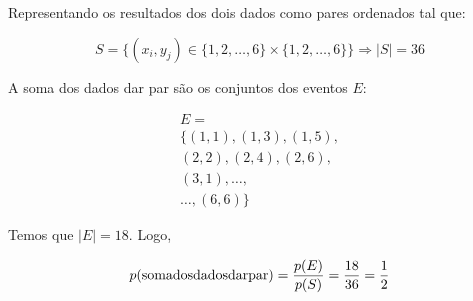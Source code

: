 \item
Representando os resultados dos dois dados como pares ordenados tal que:

\[S = \{(x_i,y_j) \in \{1,2,\dots,6\} \times \{1,2,\dots,6\}\} \Rightarrow |S| = 36\]

A soma dos dados dar par são os conjuntos dos eventos $E$:

\[\begin{array}{l}
E = \\
\{ (1,1),(1,3),(1,5),\\
(2,2),(2,4),(2,6),\\
(3,1), \ldots ,\\
 \ldots ,(6,6)\}
\end{array}\]

Temos que $|E| = 18$. Logo,

\[p({\rm{soma dos dados dar par}}) = \frac{{p(E)}}{{p(S)}} = \frac{{18}}{{36}} = \frac{1}{2}\]
